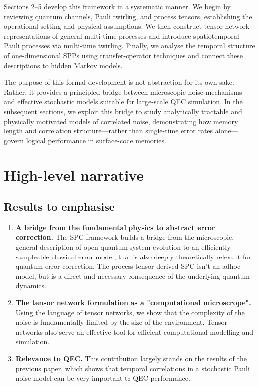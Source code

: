 \documentclass{article}
\begin{document}
Sections 2–5 develop this framework in a systematic manner. We begin by reviewing quantum channels, Pauli twirling, and process tensors, establishing the operational setting and physical assumptions. We then construct tensor-network representations of general multi-time processes and introduce spatiotemporal Pauli processes via multi-time twirling. Finally, we analyse the temporal structure of one-dimensional SPPs using transfer-operator techniques and connect these descriptions to hidden Markov models.

The purpose of this formal development is not abstraction for its own sake. Rather, it provides a principled bridge between microscopic noise mechanisms and effective stochastic models suitable for large-scale QEC simulation. In the subsequent sections, we exploit this bridge to study analytically tractable and physically motivated models of correlated noise, demonstrating how memory length and correlation structure—rather than single-time error rates alone—govern logical performance in surface-code memories.

\section{High-level narrative}

\subsection{Results to emphasise}
\begin{enumerate}
    \item \textbf{A bridge from the fundamental physics to abstract error correction.} The SPC framework builds a bridge from the microscopic, general description of open quantum system evolution to an efficiently sampleable classical error model, that is also deeply theoretically relevant for quantum error correction. The process tensor-derived SPC isn't an adhoc model, but is a direct and necessary consequence of the underlying quantum dynamics.
    \item \textbf{The tensor network formulation as a "computational microscrope".} Using the language of tensor networks, we show that the complexity of the noise is fundamentally limited by the size of the environment. Tensor networks also serve an effective tool for efficient computational modelling and simulation.
    \item \textbf{Relevance to QEC.} This contribution largely stands on the results of the previous paper, which shows that temporal correlations in a stochastic Pauli noise model can be very important to QEC performance.
    
\end{enumerate}
\end{document}
